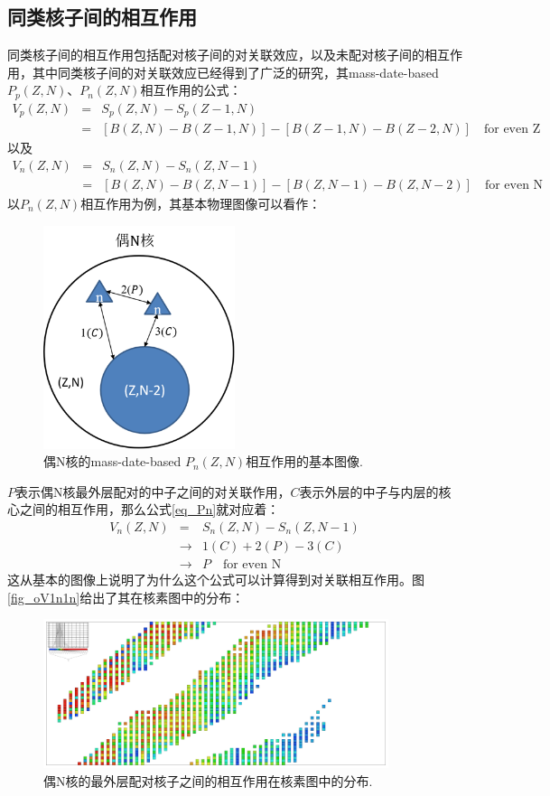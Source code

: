 \subsection{同类核子间的相互作用}
同类核子间的相互作用包括配对核子间的对关联效应，以及未配对核子间的相互作用，其中同类核子间的对关联效应已经得到了广泛的研究，其mass-date-based $P_p(Z,N)$、$P_n(Z,N)$相互作用的公式\cite{RN560}：
\begin{eqnarray}
  V_p(Z,N)&=&S_p(Z,N)-S_p(Z-1,N)\\
  &=&[B(Z,N)-B(Z-1,N)]-[B(Z-1,N)-B(Z-2,N)]\quad \textrm{for even Z}\nonumber
\end{eqnarray}
以及
\begin{eqnarray}\label{eq_Pn}
  V_n(Z,N)&=&S_n(Z,N)-S_n(Z,N-1)\\
  &=&[B(Z,N)-B(Z,N-1)]-[B(Z,N-1)-B(Z,N-2)]\quad \textrm{for even N}\nonumber
\end{eqnarray}
以$P_n(Z,N)$相互作用为例，其基本物理图像可以看作：
\begin{figure}[H]
\centering
\includegraphics[width=0.5\textwidth]{figure/zV1n1ne.png}
\caption{偶N核的mass-date-based $P_n(Z,N)$相互作用的基本图像.\label{fig_zV1n1ne}}
\end{figure}
$P$表示偶N核最外层配对的中子之间的对关联作用，$C$表示外层的中子与内层的核心之间的相互作用，那么公式\ref{eq_Pn}就对应着：
\begin{eqnarray}
  V_n(Z,N)&=&S_n(Z,N)-S_n(Z,N-1)\\ \nonumber
  &\to&1(C)+2(P)-3(C)\\ \nonumber
  &\to&P\quad \textrm{for even N}\nonumber
\end{eqnarray}
这从基本的图像上说明了为什么这个公式可以计算得到对关联相互作用。图\ref{fig_oV1n1n}给出了其在核素图中的分布：
\begin{figure}[H]
\centering
\includegraphics[width=0.9\textwidth]{figure/expVPn50eN.pdf}
\caption{偶N核的最外层配对核子之间的相互作用在核素图中的分布.\label{fig_expVPn50eN}}
\end{figure}
